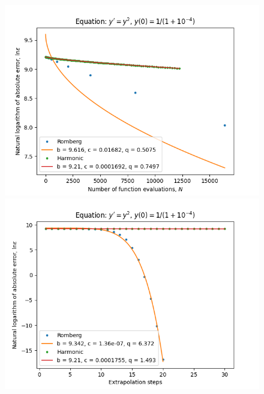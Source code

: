 \begin{figure}[H]
\centering
\begin{minipage}{0.45\textwidth}
\centering
\includegraphics[scale=0.45]{../results/emr_plots/singularity_4_hp_trend.png}
\end{minipage}
\begin{minipage}{0.45\textwidth}
\centering
\includegraphics[scale=0.45]{../results/emr_plots/singularity_4_hp_steps.png}
\end{minipage}
\end{figure}

